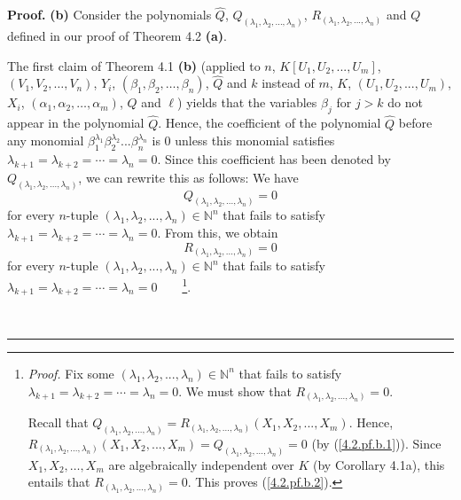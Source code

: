 \documentclass[numbers=enddot,12pt,final,onecolumn,notitlepage]{scrartcl}%
\newenvironment{proof}[1][Proof]{\noindent\textbf{#1.} }{\ \rule{0.5em}{0.5em}}
\begin{document}
\begin{proof}
\textbf{(b)} Consider the polynomials $\widehat{Q}$, $Q_{\left(  \lambda
_{1},\lambda_{2},...,\lambda_{n}\right)  }$, $R_{\left(  \lambda_{1}%
,\lambda_{2},...,\lambda_{n}\right)  }$ and $Q$ defined in our proof of
Theorem 4.2 \textbf{(a)}.

The first claim of Theorem 4.1 \textbf{(b)} (applied to $n$, $K\left[
U_{1},U_{2},...,U_{m}\right]  $, $\left(  V_{1},V_{2},\ldots,V_{n}\right)  $,
$Y_{i}$, $\left(  \beta_{1},\beta_{2},\ldots,\beta_{n}\right)  $,
$\widehat{Q}$ and $k$ instead of $m$, $K$, $\left(  U_{1},U_{2},...,U_{m}%
\right)  $, $X_{i}$, $\left(  \alpha_{1},\alpha_{2},\ldots,\alpha_{m}\right)
$, $Q$ and $\ell$) yields that the variables $\beta_{j}$ for $j>k$ do not
appear in the polynomial $\widehat{Q}$. Hence, the coefficient of the
polynomial $\widehat{Q}$ before any monomial $\beta_{1}^{\lambda_{1}}\beta
_{2}^{\lambda_{2}}...\beta_{n}^{\lambda_{n}}$ is $0$ unless this monomial
satisfies $\lambda_{k+1}=\lambda_{k+2}=\cdots=\lambda_{n}=0$. Since this
coefficient has been denoted by $Q_{\left(  \lambda_{1},\lambda_{2}%
,...,\lambda_{n}\right)  }$, we can rewrite this as follows: We have
\begin{equation}
Q_{\left(  \lambda_{1},\lambda_{2},...,\lambda_{n}\right)  }=0
\label{4.2.pf.b.1}%
\end{equation}
for every $n$-tuple $\left(  \lambda_{1},\lambda_{2},...,\lambda_{n}\right)
\in\mathbb{N}^{n}$ that fails to satisfy $\lambda_{k+1}=\lambda_{k+2}%
=\cdots=\lambda_{n}=0$. From this, we obtain%
\begin{equation}
R_{\left(  \lambda_{1},\lambda_{2},...,\lambda_{n}\right)  }=0
\label{4.2.pf.b.2}%
\end{equation}
for every $n$-tuple $\left(  \lambda_{1},\lambda_{2},...,\lambda_{n}\right)
\in\mathbb{N}^{n}$ that fails to satisfy $\lambda_{k+1}=\lambda_{k+2}%
=\cdots=\lambda_{n}=0$\ \ \ \ \footnote{\textit{Proof.} Fix some $\left(
\lambda_{1},\lambda_{2},...,\lambda_{n}\right)  \in\mathbb{N}^{n}$ that fails
to satisfy $\lambda_{k+1}=\lambda_{k+2}=\cdots=\lambda_{n}=0$. We must show
that $R_{\left(  \lambda_{1},\lambda_{2},...,\lambda_{n}\right)  }=0$.
\par
Recall that $Q_{\left(  \lambda_{1},\lambda_{2},...,\lambda_{n}\right)
}=R_{\left(  \lambda_{1},\lambda_{2},...,\lambda_{n}\right)  }\left(
X_{1},X_{2},...,X_{m}\right)  $. Hence, $R_{\left(  \lambda_{1},\lambda
_{2},...,\lambda_{n}\right)  }\left(  X_{1},X_{2},...,X_{m}\right)
=Q_{\left(  \lambda_{1},\lambda_{2},...,\lambda_{n}\right)  }=0$ (by
(\ref{4.2.pf.b.1})). Since $X_{1},X_{2},\ldots,X_{m}$ are algebraically
independent over $K$ (by Corollary 4.1a), this entails that $R_{\left(
\lambda_{1},\lambda_{2},...,\lambda_{n}\right)  }=0$. This proves
(\ref{4.2.pf.b.2}).}.


\end{proof}
\end{document}
